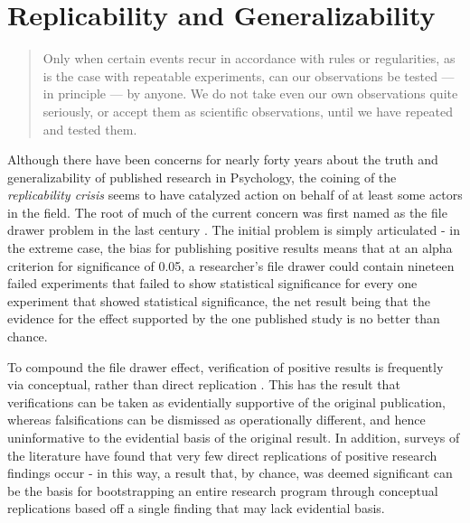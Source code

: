 \documentclass[12pt,a4paper,titlepage]{scrreprt}
\begin{document}
\section{Replicability and Generalizability}

\begin{quote}
Only when certain events recur in accordance with rules or regularities, as is the case with
repeatable experiments, can our observations be tested — in principle — by anyone. We do not take even our own observations quite seriously, or accept them as scientific observations, until we have repeated and tested them. \parencite[p.~23]{popper_logic_1959}
\end{quote}

Although there have been concerns for nearly forty years \parencite{greenwald_consequences_1975} about the truth and generalizability of published research in Psychology, the coining of the \textit{replicability crisis} \parencite{pashler_editors_2012} seems to have catalyzed action on behalf of at least some actors in the field. The root of much of the current concern was first named as the file drawer problem in the last century \parencite{rosenthal_file_1979}. The initial problem is simply articulated - in the extreme case, the bias for publishing positive results means that at an alpha criterion for significance of 0.05, a researcher's file drawer could contain nineteen failed experiments that failed to show statistical significance for every one experiment that showed statistical significance, the net result being that the evidence for the effect supported by the one published study is no better than chance.

To compound the file drawer effect, verification of positive results is frequently via conceptual, rather than direct replication \parencite{pashler_is_2012}. This has the result that verifications can be taken as evidentially supportive of the original publication, whereas falsifications can be dismissed as operationally different, and hence uninformative to the evidential basis of the original result. In addition, surveys of the literature have found that very few direct replications of positive research findings occur \parencite{makel_replications_2012} - in this way, a result that, by chance, was deemed significant can be the basis for bootstrapping an entire research program through conceptual replications based off a single finding that may lack evidential basis.
\end{document}

